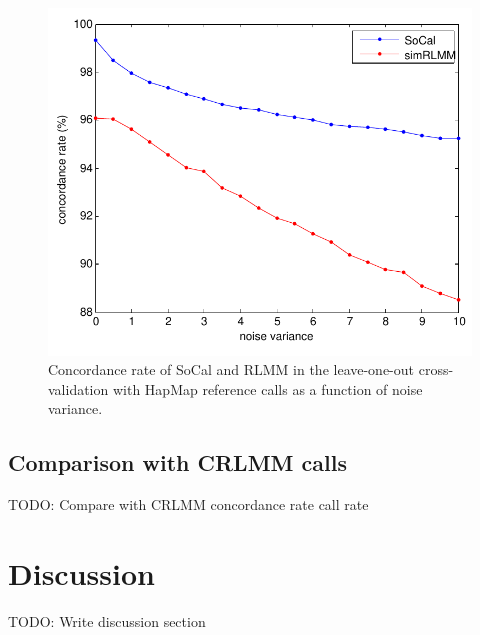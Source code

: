 \documentclass{scrartcl}
\begin{document}
\begin{figure}[H]
\centering
\includegraphics[scale=0.75]
{result_figs/cmp_socal_gauss_noise/socal_gauss_cmp_noise.pdf}
\caption{Concordance rate of SoCal and RLMM in the leave-one-out
cross-validation with HapMap reference calls as a function of noise variance.}
\label{fig:result_sh_crvacc}
\end{figure}


\subsection{Comparison with CRLMM calls}
TODO: Compare with CRLMM
concordance rate
call rate













\section{Discussion}
TODO: Write discussion section

\end{document}
